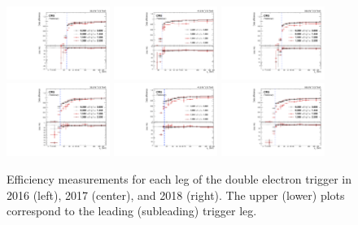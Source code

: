 \begin{figure}[tb]
	\begin{center}
		\includegraphics[width=0.30\textwidth]{fig/SFs/2016_ele_trg1_1D.pdf}
		\includegraphics[width=0.30\textwidth]{fig/SFs/2017_ele_trg1_1D.pdf}
		\includegraphics[width=0.30\textwidth]{fig/SFs/2018_ele_trg1_1D.pdf}
		\includegraphics[width=0.30\textwidth]{fig/SFs/2016_ele_trg2_1D.pdf}
		\includegraphics[width=0.30\textwidth]{fig/SFs/2017_ele_trg2_1D.pdf}
		\includegraphics[width=0.30\textwidth]{fig/SFs/2018_ele_trg2_1D.pdf}
	\end{center}
	\caption{Efficiency measurements for each leg of the double electron trigger in 2016 (left), 2017 (center), and 2018 (right). The upper (lower) plots correspond to the 
	leading (subleading) trigger leg.}
	\label{fig:ele_trig_SF}
\end{figure}

